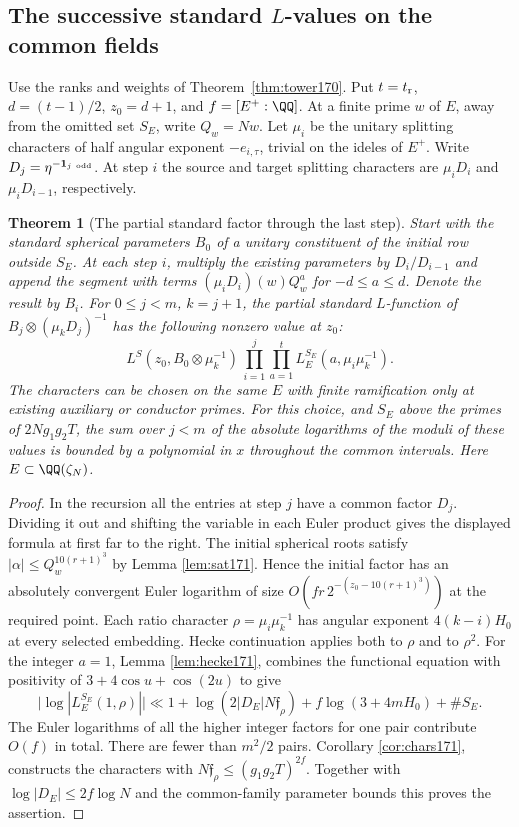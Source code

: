 \documentclass[a4paper,11pt]{article}
\newtheorem{theorem}[proposition]{Theorem}
\theoremstyle{definition}
\theoremstyle{remark}
\numberwithin{equation}{section}
\begin{document}
\subsection{The successive standard \texorpdfstring{\(L\)}{L}-values on the common fields}\label{nav:VIII-19}
Use the ranks and weights of Theorem~\ref{thm:tower170}. Put
\(t=t_{\rm r}\), \(d=(t-1)/2\), \(z_0=d+1\), and \(f=[E^+:\QQ]\).
At a finite prime \(w\) of \(E\), away from the omitted set \(S_E\),
write \(Q_w=Nw\). Let \(\mu_i\) be the unitary splitting characters
of half angular exponent \(-e_{i,\tau}\), trivial on the ideles
of \(E^+\). Write \(D_j=\eta^{-\mathbf1_{j\ {\rm odd}}}\).
At step \(i\) the source and target splitting characters are
\(\mu_iD_i\) and \(\mu_iD_{i-1}\), respectively.

\begin{theorem}[The partial standard factor through the last step]
\label{thm:values172}
Start with the standard spherical parameters \(B_0\) of a
unitary constituent of the initial row outside \(S_E\). At
each step \(i\), multiply the existing parameters by
\(D_i/D_{i-1}\) and append the segment with terms
\((\mu_iD_i)(w)Q_w^a\) for \(-d\le a\le d\). Denote the
result by \(B_i\). For \(0\le j<m\), \(k=j+1\), the partial
standard \(L\)-function of \(B_j\otimes(\mu_kD_j)^{-1}\)
has the following nonzero value at \(z_0\):
\[
 L^S(z_0,B_0\otimes\mu_k^{-1})\,
                    \prod_{i=1}^j\prod_{a=1}^t
                    L_E^{S_E}(a,\mu_i\mu_k^{-1}).
\]
The characters can be chosen on the same \(E\) with finite
ramification only at existing auxiliary or conductor primes.
For this choice, and \(S_E\) above the primes of \(2Ng_1g_2T\),
the sum over \(j<m\) of the absolute logarithms of the moduli
of these values is bounded by a polynomial in \(x\) throughout
the common intervals. Here \(E\subset\QQ(\zeta_N)\).
\end{theorem}
\begin{proof}
In the recursion all the entries at step \(j\) have a common
factor \(D_j\). Dividing it out and shifting the variable in
each Euler product gives the displayed formula at first far
to the right. The initial spherical roots satisfy
\(|\alpha|\le Q_w^{10(r+1)^3}\) by Lemma \ref{lem:sat171}.
Hence the initial factor has an absolutely convergent Euler
logarithm of size \(O(fr\,2^{-(z_0-10(r+1)^3)})\) at the
required point. Each ratio character \(\rho=\mu_i\mu_k^{-1}\)
has angular exponent \(4(k-i)H_0\) at every selected embedding.
Hecke continuation applies both to \(\rho\) and to \(\rho^2\).
For the integer \(a=1\), Lemma \ref{lem:hecke171}, combines the
functional equation with positivity of
\(3+4\cos u+\cos(2u)\) to give
\[
  \big|\log|L_E^{S_E}(1,\rho)|\big|
     \ll 1+\log(2|D_E|N\mathfrak f_\rho)
           + f\log(3+4mH_0)+\#S_E .
\]
The Euler logarithms of all the higher integer factors for
one pair contribute \(O(f)\) in total. There are fewer than
\(m^2/2\) pairs. Corollary \ref{cor:chars171}, constructs the
characters with \(N\mathfrak f_\rho\le(g_1g_2T)^{2f}\).
Together with \(\log|D_E|\le2f\log N\) and the common-family
parameter bounds this proves the assertion.
\end{proof}
\end{document}
